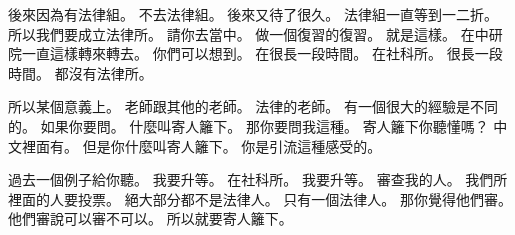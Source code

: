 \hypertarget{c01:cue:3922}{}後來因為有法律組。
\hypertarget{c01:cue:3923}{}不去法律組。
\hypertarget{c01:cue:3924}{}後來又待了很久。
\hypertarget{c01:cue:3925}{}法律組一直等到一二折。
\hypertarget{c01:cue:3926}{}所以我們要成立法律所。
\hypertarget{c01:cue:3927}{}請你去當中。
\hypertarget{c01:cue:3928}{}做一個復習的復習。
\hypertarget{c01:cue:3929}{}就是這樣。
\hypertarget{c01:cue:3930}{}在中研院一直這樣轉來轉去。
\hypertarget{c01:cue:3931}{}你們可以想到。
\hypertarget{c01:cue:3932}{}在很長一段時間。
\hypertarget{c01:cue:3933}{}在社科所。
\hypertarget{c01:cue:3934}{}很長一段時間。
\hypertarget{c01:cue:3935}{}都沒有法律所。

\hypertarget{c01:cue:3936}{}所以某個意義上。
\hypertarget{c01:cue:3937}{}老師跟其他的老師。
\hypertarget{c01:cue:3938}{}法律的老師。
\hypertarget{c01:cue:3939}{}有一個很大的經驗是不同的。
\hypertarget{c01:cue:3940}{}如果你要問。
\hypertarget{c01:cue:3941}{}什麼叫寄人籬下。
\hypertarget{c01:cue:3942}{}那你要問我這種。
\hypertarget{c01:cue:3943}{}寄人籬下你聽懂嗎？
\hypertarget{c01:cue:3944}{}中文裡面有。
\hypertarget{c01:cue:3945}{}但是你什麼叫寄人籬下。
\hypertarget{c01:cue:3946}{}你是引流這種感受的。

\hypertarget{c01:cue:3947}{}過去一個例子給你聽。
\hypertarget{c01:cue:3948}{}我要升等。
\hypertarget{c01:cue:3949}{}在社科所。
\hypertarget{c01:cue:3950}{}我要升等。
\hypertarget{c01:cue:3951}{}審查我的人。
\hypertarget{c01:cue:3952}{}我們所裡面的人要投票。
\hypertarget{c01:cue:3953}{}絕大部分都不是法律人。
\hypertarget{c01:cue:3954}{}只有一個法律人。
\hypertarget{c01:cue:3955}{}那你覺得他們審。
\hypertarget{c01:cue:3956}{}他們審說可以審不可以。
\hypertarget{c01:cue:3957}{}所以就要寄人籬下。

